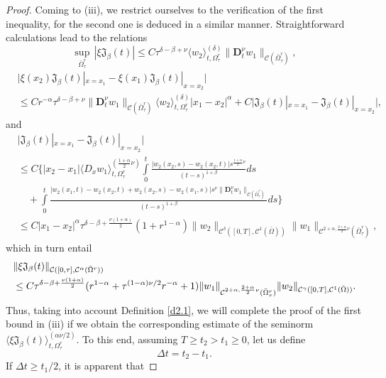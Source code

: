 \documentclass[10pt,a4paper]{amsart}
\def\C {\mathcal{C}}
\begin{document}
\begin{proof}
Coming to (iii), we restrict ourselves to the verification of the first inequality, for the second one is deduced in a similar manner.
Straightforward calculations lead to the relations
\[
\underset{\bar{\Omega}_{\tau}^{r}}{\sup}\,|\xi\mathfrak{J}_{\beta}(t)|\leq C\tau^{\delta-\beta+\nu}
\langle w_2\rangle_{t,\Omega_{\tau}^{r}}^{(\delta)}\|\mathbf{D}_{t}^{\nu}w_1\|_{\C(\bar{\Omega}_{\tau}^{r})},
\]
\begin{align*}
&\Big|\xi(x_2)\mathfrak{J}_{\beta}(t)|_{x=x_1}-\xi(x_1)\mathfrak{J}_{\beta}(t)|_{x=x_2}\Big|
\\
&
\leq C r^{-\alpha}\tau^{\delta-\beta+\nu}
\|\mathbf{D}_{t}^{\nu}w_1\|_{\C(\bar{\Omega}_{\tau}^{r})}
\langle w_2\rangle_{t,\Omega_{\tau}^{r}}^{(\delta)}|x_1-x_2|^{\alpha}+C\Big|\mathfrak{J}_{\beta}(t)|_{x=x_1}-\mathfrak{J}_{\beta}(t)|_{x=x_2}\Big|,
\end{align*}
and
\begin{align*}
&\Big|\mathfrak{J}_{\beta}(t)|_{x=x_1}-\mathfrak{J}_{\beta}(t)|_{x=x_2}\Big|
\\
&
\leq C\Big\{|x_2-x_1|\langle D_{x}w_1\rangle_{t,\Omega_{\tau}^{r}}^{(\frac{1+\alpha}{2}\nu)}\int\limits_{0}^{t}\frac{|w_2(x_2,s)-w_2(x_2,t)|s^{\frac{1+\alpha}{2}\nu}}{(t-s)^{1+\beta}}ds
\\&\quad+\int\limits_{0}^{t}\frac{|w_2(x_1,t)-w_2(x_2,t)+w_2(x_2,s)-w_{2}(x_1,s)|s^{\nu}\|\mathbf{D}_{t}^{\nu}w_1\|_{\C(\bar{\Omega}_{\tau}^{r})}}{(t-s)^{1+\beta}}ds
\Big\}\\
&
\leq C |x_1-x_2|^{\alpha}\tau^{\delta-\beta+\frac{\nu(1+\alpha)}{2}}(1+r^{1-\alpha})
\|w_2\|_{\C^{\delta}([0,T],\C^{1}(\bar{\Omega}))}\|w_1\|_{\C^{2+\alpha,\frac{2+\alpha}{2}\nu}(\bar{\Omega}_{\tau}^{r})},\end{align*}
which in turn entail
\begin{align}\label{4.3}\notag
&\|\xi\mathfrak{J}_{\beta}(t)\|_{\C([0,\tau],\C^{\alpha}(\bar{\Omega}^{r}))}
\\&\leq
C\tau^{\delta-\beta+\frac{\nu(1+\alpha)}{2}}
(r^{1-\alpha}+\tau^{(1-\alpha)\nu/2}r^{-\alpha}+1)\|w_1\|_{\C^{2+\alpha,\frac{2+\alpha}{2}\nu}(\bar{\Omega}^{r}_{\tau})}\|w_{2}\|_{\C^{\gamma}([0,T],\C^{1}(\bar{\Omega}))}.
\end{align}
Thus, taking into account Definition \ref{d2.1}, we will complete the proof of the first bound in (iii) if we obtain the corresponding estimate of the
seminorm $\langle \xi\mathfrak{J}_{\beta}(t)\rangle_{t,\Omega_{\tau}^{r}}^{(\alpha\nu/2)}$. To this end, assuming $T\geq t_{2}>t_1\geq 0$,
let us define
$$\Delta t=t_{2}-t_1.$$
If $\Delta t\geq t_1/2$, it is apparent that

\end{proof}
\end{document}
